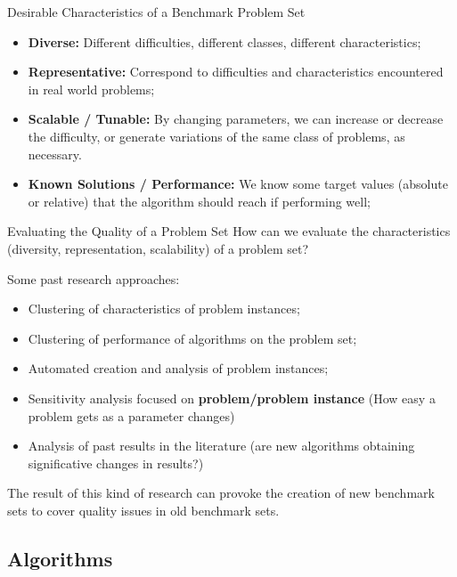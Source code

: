 \documentclass[aspectratio=169]{beamer}
\begin{document}
\begin{frame}{Desirable Characteristics of a Benchmark Problem Set}
  \begin{itemize}
    \item {\bf Diverse:} Different difficulties, different classes, different characteristics;
    \item {\bf Representative:} Correspond to difficulties and characteristics encountered in real world problems;
    \item {\bf Scalable / Tunable:} By changing parameters, we can increase or decrease the difficulty, or generate variations of the same class of problems, as necessary.
    \item {\bf Known Solutions / Performance:} We know some target values (absolute or relative) that the algorithm should reach if performing well;
  \end{itemize}
\end{frame}

\begin{frame}[t]{Evaluating the Quality of a Problem Set}
  How can we evaluate the characteristics (diversity, representation, scalability) of a problem set? \bigskip 

  Some past research approaches:
  \begin{itemize}
    \item Clustering of characteristics of problem instances;
    \item Clustering of performance of algorithms on the problem set;
    \item Automated creation and analysis of problem instances;
    \item Sensitivity analysis focused on {\bf problem/problem instance} (How easy a problem gets as a parameter changes)
    \item Analysis of past results in the literature (are new algorithms obtaining significative changes in results?)
  \end{itemize}\bigskip 

  The result of this kind of research can provoke the creation of new benchmark sets to cover quality issues in old benchmark sets. 
  
\end{frame}


\subsection{Algorithms}
\end{document}

